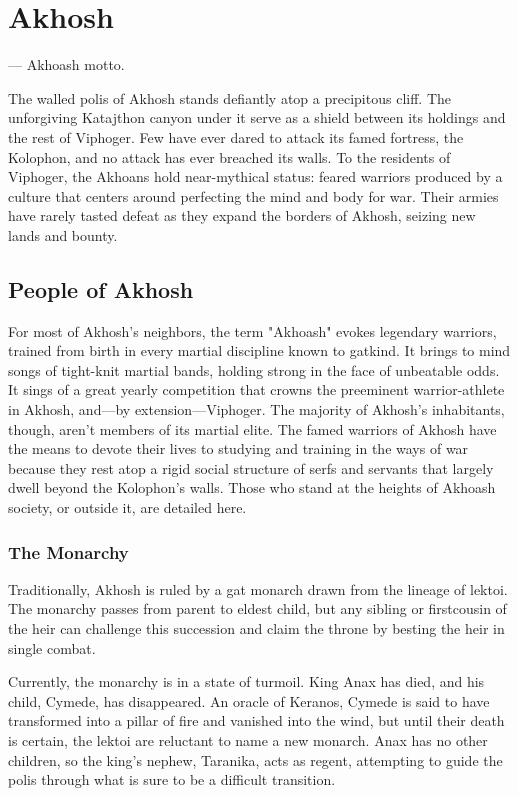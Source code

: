 \section{Akhosh} \label{sec::akhosh}

\hspace*{\fill} --- Akhoash motto.

The walled polis of Akhosh stands defiantly atop a precipitous cliff.
The unforgiving Katajthon canyon under it serve as a shield between its holdings and the rest of Viphoger.
Few have ever dared to attack its famed fortress, the Kolophon, and no attack has ever breached its walls.
To the residents of Viphoger, the Akhoans hold near-mythical status: feared warriors produced by a culture that centers around perfecting the mind and body for war.
Their armies have rarely tasted defeat as they expand the borders of Akhosh, seizing new lands and bounty.

\subsection*{People of Akhosh} \label{ssec::peopleofakhosh}
    For most of Akhosh's neighbors, the term "Akhoash" evokes legendary warriors, trained from birth in every martial discipline known to gatkind.
    It brings to mind songs of tight-knit martial bands, holding strong in the face of unbeatable odds.
    It sings of a great yearly competition that crowns the preeminent warrior-athlete in Akhosh, and—by extension—Viphoger.
    The majority of Akhosh's inhabitants, though, aren't members of its martial elite.
    The famed warriors of Akhosh have the means to devote their lives to studying and training in the ways of war because they rest atop a rigid social structure of serfs and servants that largely dwell beyond the Kolophon's walls.
    Those who stand at the heights of Akhoash society, or outside it, are detailed here.

    \subsubsection{The Monarchy}
        Traditionally, Akhosh is ruled by a gat monarch drawn from the lineage of lektoi.
        The monarchy passes from parent to eldest child, but any sibling or firstcousin of the heir can challenge this succession and claim the throne by besting the heir in single combat.

        Currently, the monarchy is in a state of turmoil.
        King Anax has died, and his child, Cymede, has disappeared.
        An oracle of Keranos, Cymede is said to have transformed into a pillar of fire and vanished into the wind, but until their death is certain, the lektoi are reluctant to name a new monarch.
        Anax has no other children, so the king's nephew, Taranika, acts as regent, attempting to guide the polis through what is sure to be a difficult transition.

